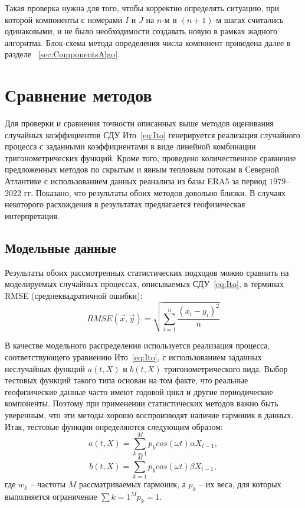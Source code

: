 Такая проверка нужна для того, чтобы корректно определять ситуацию, при которой компоненты с номерами $I$ и $J$ на $n$-м и $(n+1)$-м шагах считались одинаковыми, и не было необходимости создавать новую в рамках жадного алгоритма. Блок-схема метода определения числа компонент приведена далее в разделе ~\ref{sec:ComponentsAlgo}.


\section{Сравнение методов}
\label{sec:Compare}
Для проверки и сравнения точности описанных выше методов оценивания случайных коэффициентов СДУ Ито~\eqref{eq:Ito} генерируется реализация случайного процесса с заданными коэффициентами в виде линейной комбинации тригонометрических функций. Кроме того, проведено количественное сравнение предложенных методов по скрытым и явным тепловым потокам в Северной Атлантике с использованием данных реанализа из базы ERA5 за период $1979$--$2022$ гг. Показано, что результаты обоих методов довольно близки. В случаях некоторого расхождения в результатах предлагается геофизическая интерпретация.

\subsection{Модельные данные}
\label{sec:ModelData}
Результаты обоих рассмотренных статистических подходов можно сравнить на моделируемых случайных процессах, описываемых СДУ~\eqref{eq:Ito}, в терминах RMSE (среднеквадратичной ошибки):
$$
RMSE(\vec{x}, \vec{y}) = \sqrt{\sum\limits_{i=1}^n \frac{(x_i - y_i)^2}{n}}
$$

В качестве модельного распределения используется реализация процесса, соответствующего уравнению Ито~\eqref{eq:Ito}, с использованием заданных неслучайных функций $a(t,X)$ и $b(t,X)$ тригонометрического вида. Выбор тестовых функций такого типа основан на том факте, что реальные геофизические данные часто имеют годовой цикл и другие периодические компоненты. Поэтому при применении статистических методов важно быть уверенным, что эти методы хорошо воспроизводят наличие гармоник в данных. Итак, тестовые функции определяются следующим образом:
$$
a(t, X) = \sum\limits_{k=1}^M p_k cos(\omega t) \alpha X_{t-1},
$$
$$
b(t, X) = \sum\limits_{k=1}^M p_k cos(\omega t) \beta X_{t-1},
$$
где $w_k$ -- частоты $M$ рассматриваемых гармоник, а $p_k$ -- их веса, для которых выполняется ограничение $\sum\limits{k=1}^M p_k = 1$.

